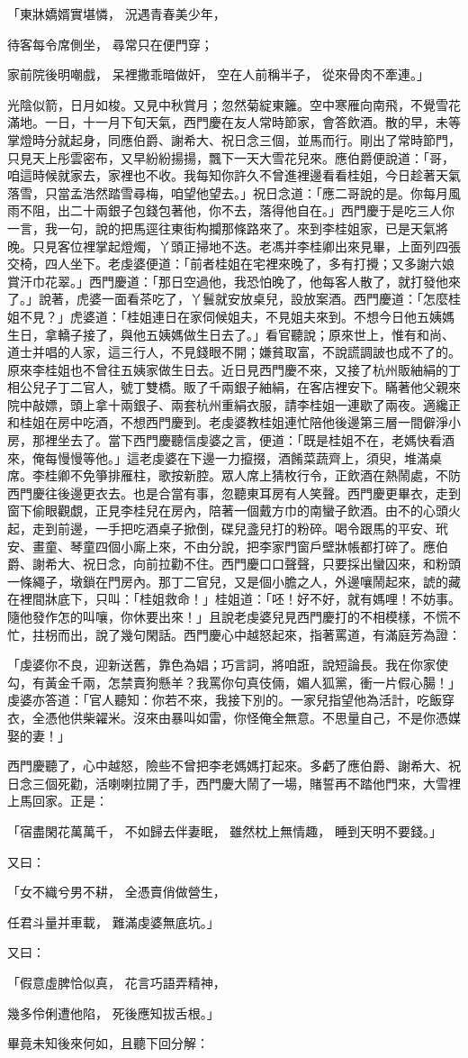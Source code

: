 「東牀嬌婿實堪憐，  況遇青春美少年，

待客每令席側坐，  尋常只在便門穿；

家前院後明嘲戲，  呆裡撒乖暗做奸，     空在人前稱半子，  從來骨肉不牽連。」

光陰似箭，日月如梭。又見中秋賞月；忽然菊綻東籬。空中寒雁向南飛，不覺雪花滿地。一日，十一月下旬天氣，西門慶在友人常時節家，會答飲酒。散的早，未等掌燈時分就起身，同應伯爵、謝希大、祝日念三個，並馬而行。剛出了常時節門，只見天上彤雲密布，又早紛紛揚揚，飄下一天大雪花兒來。應伯爵便說道：「哥，咱這時候就家去，家裡也不收。我每知你許久不曾進裡邊看看桂姐，今日趁著天氣落雪，只當孟浩然踏雪尋梅，咱望他望去。」祝日念道：「應二哥說的是。你每月風雨不阻，出二十兩銀子包錢包著他，你不去，落得他自在。」西門慶于是吃三人你一言，我一句，說的把馬逕往東街构攔那條路來了。來到李桂姐家，已是天氣將晚。只見客位裡掌起燈燭，丫頭正掃地不迭。老馮并李桂卿出來見畢，上面列四張交椅，四人坐下。老虔婆便道：「前者桂姐在宅裡來晚了，多有打攪；又多謝六娘賞汗巾花翠。」西門慶道：「那日空過他，我恐怕晚了，他每客人散了，就打發他來了。」說著，虎婆一面看茶吃了，丫鬟就安放桌兒，設放案酒。西門慶道：「怎麼桂姐不見？」虎婆道：「桂姐連日在家伺候姐夫，不見姐夫來到。不想今日他五姨媽生日，拿轎子接了，與他五姨媽做生日去了。」看官聽說；原來世上，惟有和尚、道士并唱的人家，這三行人，不見錢眼不開；嫌貧取富，不說謊調詖也成不了的。原來李桂姐也不曾往五姨家做生日去。近日見西門慶不來，又接了杭州販紬絹的丁相公兒子丁二官人，號丁雙橋。販了千兩銀子紬絹，在客店裡安下。瞞著他父親來院中敲嫖，頭上拿十兩銀子、兩套杭州重絹衣服，請李桂姐一連歇了兩夜。適纔正和桂姐在房中吃酒，不想西門慶到。老虔婆教桂姐連忙陪他後邊第三層一間僻淨小房，那裡坐去了。當下西門慶聽信虔婆之言，便道：「既是桂姐不在，老媽快看酒來，俺每慢慢等他。」這老虔婆在下邊一力攛掇，酒餚菜蔬齊上，須臾，堆滿桌席。李桂卿不免箏排雁柱，歌按新腔。眾人席上猜枚行令，正飲酒在熱鬧處，不防西門慶往後邊更衣去。也是合當有事，忽聽東耳房有人笑聲。西門慶更畢衣，走到窗下偷眼觀覷，正見李桂兒在房內，陪著一個戴方巾的南蠻子飲酒。由不的心頭火起，走到前邊，一手把吃酒桌子掀倒，碟兒盞兒打的粉碎。喝令跟馬的平安、玳安、畫童、琴童四個小廝上來，不由分說，把李家門窗戶壁牀帳都打碎了。應伯爵、謝希大、祝日念，向前拉勸不住。西門慶口口聲聲，只要採出蠻囚來，和粉頭一條繩子，墩鎖在門房內。那丁二官兒，又是個小膽之人，外邊嚷鬧起來，諕的藏在裡間牀底下，只叫：「桂姐救命！」桂姐道：「呸！好不好，就有媽哩！不妨事。隨他發作怎的叫嚷，你休要出來！」且說老虔婆兒見西門慶打的不相模樣，不慌不忙，拄枴而出，說了幾句閑話。西門慶心中越怒起來，指著罵道，有滿庭芳為證：

「虔婆你不良，迎新送舊，靠色為娼；巧言詞，將咱誑，說短論長。我在你家使勾，有黃金千兩，怎禁賣狗懸羊？我罵你句真伎倆，媚人狐黨，衝一片假心腸！」虔婆亦答道：「官人聽知：你若不來，我接下別的。一家兒指望他為活計，吃飯穿衣，全憑他供柴糴米。沒來由暴叫如雷，你怪俺全無意。不思量自己，不是你憑媒娶的妻！」

西門慶聽了，心中越怒，險些不曾把李老媽媽打起來。多虧了應伯爵、謝希大、祝日念三個死勸，活喇喇拉開了手，西門慶大鬧了一場，賭誓再不踏他門來，大雪裡上馬回家。正是：

「宿盡閑花萬萬千，  不如歸去伴妻眠，     雖然枕上無情趣，  睡到天明不要錢。」

又曰：

「女不織兮男不耕，  全憑賣俏做營生，

任君斗量并車載，  難滿虔婆無底坑。」

又曰：

「假意虛脾恰似真，  花言巧語弄精神，

幾多伶俐遭他陷，  死後應知拔舌根。」

畢竟未知後來何如，且聽下回分解：
